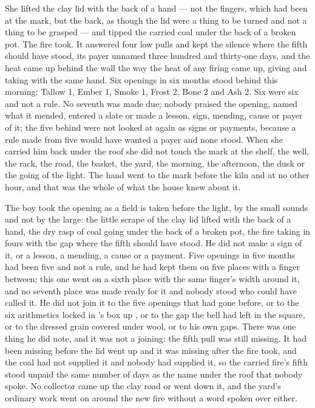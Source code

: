 She lifted the clay lid with the back of a hand --- not the fingers, which had been at the mark, but the back, as though the lid were a thing to be turned and not a thing to be grasped --- and tipped the carried coal under the back of a broken pot. The fire took. It answered four low pulls and kept the silence where the fifth should have stood, its payer unnamed three hundred and thirty-one days, and the heat came up behind the wall the way the heat of any firing came up, giving and taking with the same hand. Six openings in six months stood behind this morning: Tallow 1, Ember 1, Smoke 1, Frost 2, Bone 2 and Ash 2. Six were six and not a rule. No seventh was made due; nobody praised the opening, named what it mended, entered a slate or made a lesson, sign, mending, cause or payer of it; the five behind were not looked at again as signs or payments, because a rule made from five would have wanted a payer and none stood. When she carried him back under the roof she did not touch the mark at the shelf, the well, the rack, the road, the basket, the yard, the morning, the afternoon, the dusk or the going of the light. The hand went to the mark before the kiln and at no other hour, and that was the whole of what the house knew about it.

The boy took the opening as a field is taken before the light, by the small sounds and not by the large: the little scrape of the clay lid lifted with the back of a hand, the dry rasp of coal going under the back of a broken pot, the fire taking in fours with the gap where the fifth should have stood. He did not make a sign of it, or a lesson, a mending, a cause or a payment. Five openings in five months had been five and not a rule, and he had kept them on five places with a finger between; this one went on a sixth place with the same finger's width around it, and no seventh place was made ready for it and nobody stood who could have called it. He did not join it to the five openings that had gone before, or to the six arithmetics locked in 's box up , or to the gap the bell had left in the square, or to the dressed grain covered under wool, or to his own gaps. There was one thing he did note, and it was not a joining: the fifth pull was still missing. It had been missing before the lid went up and it was missing after the fire took, and the coal had not supplied it and nobody had supplied it, so the carried fire's fifth stood unpaid the same number of days as the name under the roof that nobody spoke. No collector came up the clay road or went down it, and the yard's ordinary work went on around the new fire without a word spoken over either.

